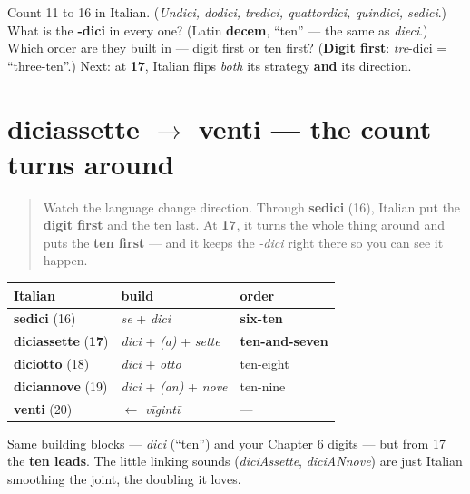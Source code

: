 \begin{tcolorbox}[breakable,colback=teal!4,colframe=teal!35!black,title={Before you move on}]
Count 11 to 16 in Italian. (\emph{Undici, dodici, tredici, quattordici, quindici, sedici}.) What is the \textbf{-dici} in every one? (Latin \textbf{decem}, \textquotedblleft{}ten\textquotedblright{} — the same as \emph{dieci}.) Which order are they built in — digit first or ten first? (\textbf{Digit first}: \emph{tre}-dici = \textquotedblleft{}three-ten\textquotedblright{}.) Next: at \textbf{17}, Italian flips \emph{both} its strategy \textbf{and} its direction.
\end{tcolorbox}
\section[diciassette — venti]{diciassette $\to$ venti — the count turns around}

\label{lesson:IT-C12-numeri-17-20}



\begin{quote}
Watch the language change direction. Through \textbf{sedici} (16), Italian put the \textbf{digit first} and the ten last. At \textbf{17}, it turns the whole thing around and puts the \textbf{ten first} — and it keeps the \emph{-dici} right there so you can see it happen.
\end{quote}

\begin{grammarlens}[title={Grammar Lens: the reversal}]
\noindent
\begin{tabularx}{\linewidth}{@{}>{\raggedright\arraybackslash}X>{\raggedright\arraybackslash}X>{\raggedright\arraybackslash}X@{}}
\toprule
\textbf{Italian} & \textbf{build} & \textbf{order} \\
\midrule
\textbf{sedici} (16) & \emph{se} + \emph{dici} & \textbf{six-ten} \\
\textbf{diciassette} (\textbf{17}) & \emph{dici} + \emph{(a)} + \emph{sette} & \textbf{ten-and-seven} \\
\textbf{diciotto} (18) & \emph{dici} + \emph{otto} & ten-eight \\
\textbf{diciannove} (19) & \emph{dici} + \emph{(an)} + \emph{nove} & ten-nine \\
\textbf{venti} (20) & $\leftarrow$ \emph{vīgintī} & — \\
\bottomrule
\end{tabularx}

Same building blocks — \emph{dici} (\textquotedblleft{}ten\textquotedblright{}) and your Chapter 6 digits — but from 17 the \textbf{ten leads}. The little linking sounds (\emph{diciAssette}, \emph{diciANnove}) are just Italian smoothing the joint, the doubling it loves.
\end{grammarlens}

